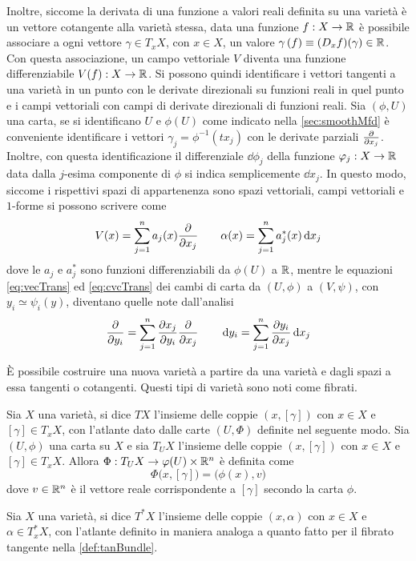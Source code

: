 Inoltre, siccome la derivata di una funzione a valori reali definita su una varietà è un vettore cotangente alla varietà stessa, data una funzione $f:X \to \mathbb{R}$ è possibile associare a ogni vettore $\gamma \in T_x X$, con $x \in X$, un valore $\gamma\,(f) \equiv (D_x f) (\gamma) \in \mathbb{R}$. Con questa associazione, un campo vettoriale $V$ diventa una funzione differenziabile $V(f): X \to \mathbb{R}$. Si possono quindi identificare i vettori tangenti a una varietà in un punto con le derivate direzionali su funzioni reali in quel punto e i campi vettoriali con campi di derivate direzionali di funzioni reali. Sia $(\phi,U)$ una carta, se si identificano $U$ e $\phi(U)$ come indicato nella \autoref{sec:smoothMfd} è conveniente identificare i vettori $\gamma_j = \phi^{-1}(tx_j)$ con le derivate parziali $\pdv{x_j}$. Inoltre, con questa identificazione il differenziale $\dd \phi_j$ della funzione $\varphi_j:X\to \mathbb{R}$ data dalla $j$-esima componente di $\phi$ si indica semplicemente $\dd x_j$. In questo modo, siccome i rispettivi spazi di appartenenza sono spazi vettoriali, campi vettoriali e $1$-forme si possono scrivere come \begin{equation*}
V(x) = \sum_{j=1}^{n} a_j(x) \pdv{x_j} \qquad \alpha(x) = \sum_{j=1}^{n} a^*_j(x) \dd{x_j}
\end{equation*} 
dove le $a_j$ e $a^*_j$ sono funzioni differenziabili da $\phi(U)$ a $\mathbb{R}$, mentre le equazioni \ref{eq:vecTrans} ed \ref{eq:cvcTrans} dei cambi di carta da $(U, \phi)$ a $(V, \psi)$, con $y_i \simeq \psi_i(y)$, diventano quelle note dall'analisi \begin{equation*}
\pdv{y_i} = \sum_{j=1}^{n} \pdv{x_j}{y_i} \pdv{x_j} \qquad \dd{y_i} = \sum_{j=1}^{n} \pdv{y_i}{x_j} \dd{x_j}
\end{equation*} 

È possibile costruire una nuova varietà a partire da una varietà e dagli spazi a essa tangenti o cotangenti. Questi tipi di varietà sono noti come fibrati.

\begin{definition} \label{def:tanBundle}
  Sia $X$ una varietà, si dice  $TX$ l'insieme delle coppie $(x,[\gamma])$ con $x \in X$ e $[\gamma] \in T_x X$, con l'atlante dato dalle carte $(U, \Phi)$ definite nel seguente modo. Sia $(U, \phi)$ una carta su $X$ e sia $T_U X$ l'insieme delle coppie $(x,[\gamma])$ con $x \in X$ e $[\gamma] \in T_x X$. Allora $\Phi:T_U X \to \varphi(U) \times \mathbb{R}^{n}$ è definita come \begin{equation}
  \Phi \big(x,[\gamma]\big) = \big(\phi(x), v\big)
  \end{equation} 
  dove $v \in \mathbb{R}^{n}$ è il vettore reale corrispondente a $[\gamma]$ secondo la carta $\phi$.
\end{definition}
\begin{definition}
  Sia $X$ una varietà, si dice  $T^*X$ l'insieme delle coppie $(x,\alpha)$ con $x \in X$ e $\alpha \in T^*_x X$, con l'atlante definito in maniera analoga a quanto fatto per il fibrato tangente nella \autoref{def:tanBundle}.
\end{definition}

